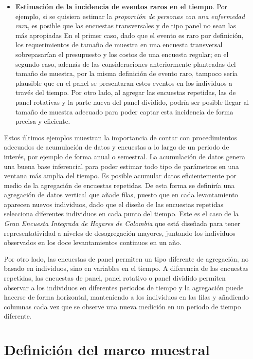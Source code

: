 \documentclass[
  12pt,
  spanish,
]{book}
\begin{document}
\begin{itemize}
\item
  \textbf{Estimación de la incidencia de eventos raros en el tiempo}. Por ejemplo, si se quisiera estimar la \emph{proporción de personas con una enfermedad rara}, es posible que las encuestas transversales y de tipo panel no sean las más apropiadas En el primer caso, dado que el evento es raro por definición, los requerimientos de tamaño de muestra en una encuesta transversal sobrepasarían el presupuesto y los costos de una encuesta regular; en el segundo caso, además de las consideraciones anteriormente planteadas del tamaño de muestra, por la misma definición de evento raro, tampoco sería plausible que en el panel se presentaran estos eventos en los individuos a través del tiempo. Por otro lado, al agregar las encuestas repetidas, las de panel rotativas y la parte nueva del panel dividido, podría ser posible llegar al tamaño de muestra adecuado para poder captar esta incidencia de forma precisa y eficiente.
\end{itemize}

Estos últimos ejemplos muestran la importancia de contar con procedimientos adecuados de acumulación de datos y encuestas a lo largo de un periodo de interés, por ejemplo de forma anual o semestral. La acumulación de datos genera una buena base inferencial para poder estimar todo tipo de parámetros en una ventana más amplia del tiempo. Es posible acumular datos eficientemente por medio de la agregación de encuestas repetidas. De esta forma se definiría una agregación de datos vertical que añade filas, puesto que en cada levantamiento aparecen nuevos individuos, dado que el diseño de las encuestas repetidas selecciona diferentes individuos en cada punto del tiempo. Este es el caso de la \emph{Gran Encuesta Integrada de Hogares de Colombia} que está diseñada para tener representatividad a niveles de desagregación mayores, juntando los individuos observados en los doce levantamientos continuos en un año.

Por otro lado, las encuestas de panel permiten un tipo diferente de agregación, no basado en individuos, sino en variables en el tiempo. A diferencia de las encuestas repetidas, las encuestas de panel, panel rotativo o panel dividido permiten observar a los individuos en diferentes periodos de tiempo y la agregación puede hacerse de forma horizontal, manteniendo a los individuos en las filas y añadiendo columnas cada vez que se observe una nueva medición en un periodo de tiempo diferente.

\hypertarget{definiciuxf3n-del-marco-muestral}{%
\chapter{Definición del marco muestral}\label{definiciuxf3n-del-marco-muestral}}
\end{document}
